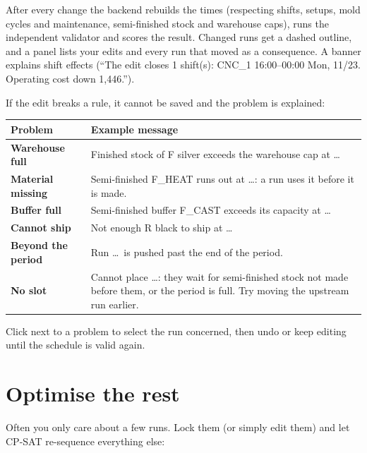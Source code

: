 After every change the backend rebuilds the times (respecting shifts, setups, mold cycles and maintenance,
semi-finished stock and warehouse caps), runs the independent validator and scores the result. Changed runs
get a dashed outline, and a  panel lists your edits and every run that moved as a consequence. A
banner explains shift effects (``The edit closes 1 shift(s): CNC\_1 16:00--00:00 Mon, 11/23. Operating cost
down 1,446.'').

If the edit breaks a rule, it cannot be saved and the problem is explained:

\begin{center}
\begin{tabularx}{\linewidth}{>{\bfseries}p{3.4cm}X}
\toprule
\rowcolor{white}Problem & Example message \\
\midrule
Warehouse full & Finished stock of F silver exceeds the warehouse cap at \dots \\
Material missing & Semi-finished F\_HEAT runs out at \dots: a run uses it before it is made. \\
Buffer full & Semi-finished buffer F\_CAST exceeds its capacity at \dots \\
Cannot ship & Not enough R black to ship at \dots \\
Beyond the period & Run \dots\ is pushed past the end of the period. \\
No slot & Cannot place \dots: they wait for semi-finished stock not made before them, or the period is full. Try moving the upstream run earlier. \\
\bottomrule
\end{tabularx}
\end{center}

Click  next to a problem to select the run concerned, then undo or keep editing until the schedule is
valid again.

\section{Optimise the rest}\label{sec:optimise-rest}

Often you only care about a few runs. Lock them (or simply edit them) and let CP-SAT re-sequence everything else:


